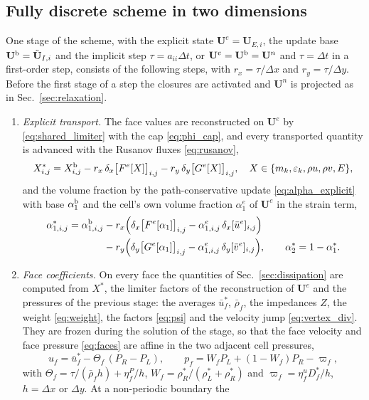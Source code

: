 \documentclass[a4paper,fleqn]{cas-sc}
\begin{document}
\subsection{Fully discrete scheme in two dimensions}
\label{sec:fully}
One stage of the scheme, with the explicit state $\mathbf U^e=\mathbf U_{E,i}$, the update base $\mathbf U^{\rm b}=\tilde{\mathbf U}_{I,i}$ and the implicit step
$\tau=a_{ii}\Delta t$, or $\mathbf U^e=\mathbf U^{\rm b}=\mathbf U^n$ and $\tau=\Delta t$ in a first-order step, consists of the following steps, with $r_x=\tau/\Delta x$
and $r_y=\tau/\Delta y$. Before the first stage of a step the closures are activated and $\mathbf U^n$ is projected as in
Sec.~\ref{sec:relaxation}.
\begin{enumerate}
\item \emph{Explicit transport.} The face values are reconstructed on $\mathbf U^e$ by \eqref{eq:shared_limiter} with the cap \eqref{eq:phi_cap}, and every
transported quantity is advanced with the Rusanov fluxes \eqref{eq:rusanov},
\[
X^*_{i,j}=X^{\rm b}_{i,j}-r_x\,\delta_x\big[F^e[X]\big]_{i,j}-r_y\,\delta_y\big[G^e[X]\big]_{i,j},\quad
X\in\{m_k,\varepsilon_k,\rho u,\rho v,E\},
\]
and the volume fraction by the path-conservative update
\eqref{eq:alpha_explicit} with base $\alpha^{\rm b}_1$ and the cell's own volume fraction $\alpha^e_1$ of $\mathbf U^e$ in the strain term,
\[
\begin{aligned}
\alpha^*_{1,i,j}=\alpha^{\rm b}_{1,i,j}&-r_x\Big(\delta_x\big[F^e[\alpha_1]\big]_{i,j}-\alpha^e_{1,i,j}\,\delta_x[\bar u^e]_{i,j}\Big)\\
&-r_y\Big(\delta_y\big[G^e[\alpha_1]\big]_{i,j}-\alpha^e_{1,i,j}\,\delta_y[\bar v^e]_{i,j}\Big),\qquad \alpha^*_2=1-\alpha^*_1 .
\end{aligned}
\]
\item \emph{Face coefficients.} On every face the quantities of Sec.~\ref{sec:dissipation} are computed from $X^*$, the
limiter factors of the reconstruction of $\mathbf U^e$ and the pressures of the previous stage: the averages $\bar u^*_f$, $\bar\rho_f$, the impedances $Z$, the weight \eqref{eq:weight},
the factors \eqref{eq:psi} and the velocity jump \eqref{eq:vertex_div}. They are frozen during the solution of the stage,
so that the face velocity and face pressure \eqref{eq:faces} are affine in the two adjacent cell pressures,
\[
u_f=\bar u^*_f-\Theta_f\,(P_R-P_L),\qquad p_f=W_fP_L+(1-W_f)P_R-\varpi_f ,
\]
with $\Theta_f=\tau/(\bar\rho_f h)+\eta^P_f/h$, $W_f=\rho^*_R/(\rho^*_L+\rho^*_R)$ and $\varpi_f=\eta^u_fD^*_f/h$, $h=\Delta x$ or $\Delta y$. At a non-periodic boundary the

\end{enumerate}
\end{document}
